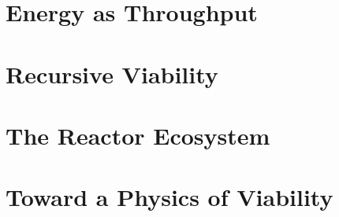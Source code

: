 \documentclass[11pt]{book}
\begin{document}
\part{Energy as Throughput}



\part{Recursive Viability}




\part{The Reactor Ecosystem}



\part{Toward a Physics of Viability}



\end{document}
